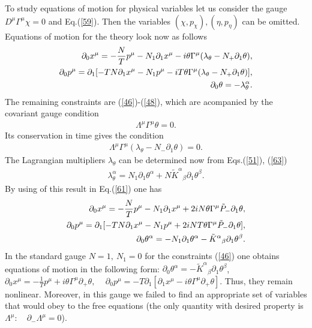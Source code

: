 \documentclass[a4paper]{article}
\begin{document}
To study equations of motion for physical variables let us consider 
the gauge $D^\mu\Gamma^\mu\chi=0$ and Eq.(\ref{59}). Then the variables 
$(\chi, p_\chi), (\eta, p_\eta)$ can be omitted. Equations of motion for 
the theory look now as follows
\begin{eqnarray}\label{61}
\partial_0x^\mu=-\frac{N}{T}p^\mu-N_1\partial_1x^\mu-
i\theta\Gamma^\mu(\lambda_\theta-N_+\partial_1\theta), \cr
\partial_0p^\mu=\partial_1[-TN\partial_1x^\mu-N_1p^\mu- 
iT\theta\Gamma^\mu(\lambda_\theta-N_+\partial_1\theta)], \cr
\partial_0\theta=-\lambda_\theta^\alpha.
\end{eqnarray}
The remaining constraints are (\ref{46})-(\ref{48}), which are 
acompanied by the covariant gauge condition 
\begin{eqnarray}\label{62}
\Lambda^\mu\Gamma^\mu\theta=0.
\end{eqnarray}
Its conservation in time gives the condition 
\begin{eqnarray}\label{63}
\Lambda^\mu\Gamma^\mu(\lambda_\theta-N_-\partial_1\theta)=0.
\end{eqnarray}
The Lagrangian multipliers $\lambda_\theta$ can be determined now from 
Eqs.(\ref{51}), (\ref{63}) 
\begin{eqnarray}\label{64}
\lambda_\theta^\alpha=N_1\partial_1\theta^\alpha+
N\tilde K^\alpha{}_\beta\partial_1\theta^\beta.
\end{eqnarray}
By using of this result in Eq.(\ref{61}) one has 
\begin{eqnarray}\label{65}
\partial_0x^\mu=-\frac{N}{T}p^\mu-N_1\partial_1x^\mu+
2iN\theta\Gamma^\mu\tilde P_-\partial_1\theta, \cr
\partial_0p^\mu=\partial_1[-TN\partial_1x^\mu-N_1p^\mu+
2iNT\theta\Gamma^\mu\tilde P_-\partial_1\theta], \cr
\partial_0\theta^\alpha=-N_1\partial_1\theta^\alpha-
\tilde K^\alpha{}_\beta\partial_1\theta^\beta.
\end{eqnarray}
In the standard gauge $N=1, ~ N_1=0$ for the constraints (\ref{46}) one 
obtains equations of motion in the following form: 
$\partial_0\theta^\alpha=-\tilde K^\alpha{}_\beta\partial_1\theta^\beta$, 
~ $\partial_0x^\mu=-\frac{1}{T}p^\mu+i\theta\Gamma^\mu\partial_+\theta,$ 
~ $\partial_0p^\mu=-T\partial_1[\partial_1x^\mu-
i\theta\Gamma^\mu\partial_+\theta]$. Thus, they remain nonlinear. 
Moreover, in this gauge we failed to find an appropriate set of 
variables that would obey to the free equations (the only quantity with 
desired property is $\Lambda^\mu$: ~ $\partial_-\Lambda^\mu=0$).
\end{document}
